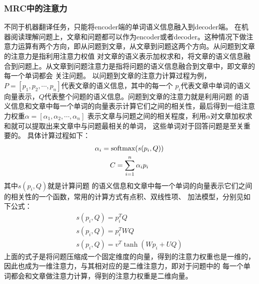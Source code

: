 \subsubsection{MRC中的注意力}
不同于机器翻译任务，只能将encoder端的单词语义信息融入到decoder端。
在机器阅读理解问题上，文章和问题都可以作为encoder或者decoder。这种情况下做注意力运算有两个方向，即从问题到文章，从文章到问题这两个方向。从问题到文章的注意力是指利用注意力权值
对文章的语义表示加权求和，将文章的语义信息融合到问题上。从文章到问题注意力是指将问题的语义信息融合到文章中，即文章的每一个单词都会
关注问题。
以问题到文章的注意力计算过程为例，$P=[p_1,p_2,\cdots,p_n]$代表文章的语义信息，其中的每一个
$p_i$代表文章中单词的语义向量表示，$Q$代表整个问题的语义信息。问题到文章的注意力就是利用问题
的语义信息和文章中每一个单词的向量表示计算它们之间的相关性，最后得到一组注意力权重$\alpha=[\alpha_1,\alpha_2,\cdots,\alpha_n]$
表示文章与问题之间的相关程度，利用$\alpha$对文章加权求和就可以提取出来文章中与问题最相关的单词，
这些单词对于回答问题是至关重要的。
具体计算过程如下：
\begin{gather}
    \alpha_i=\text{softmax}(s(p_i,Q)) \notag \\
    C=\sum_{i=1}^{n}\alpha_ip_i
\end{gather}
其中$s(p_i,Q)$就是计算问题
的语义信息和文章中每一个单词的向量表示它们之间的相关性的一个函数，常用的计算方式有点积、双线性项、
加法模型，分别见如下公式：
\begin{gather}
    s(p_i,Q)=p_i^TQ \\
    s(p_i,Q)=p_i^TWQ \\
    s(p_i,Q)=v^T\tanh(Wp_i+UQ)
\end{gather}
上面的式子是将问题压缩成一个固定维度的向量，得到的注意力权重也是一维的，因此也成为一维注意力，与其相对应的是二维注意力，即对于问题中的
每一个单词都会和文章做注意力计算，得到的注意力权重是二维向量。

